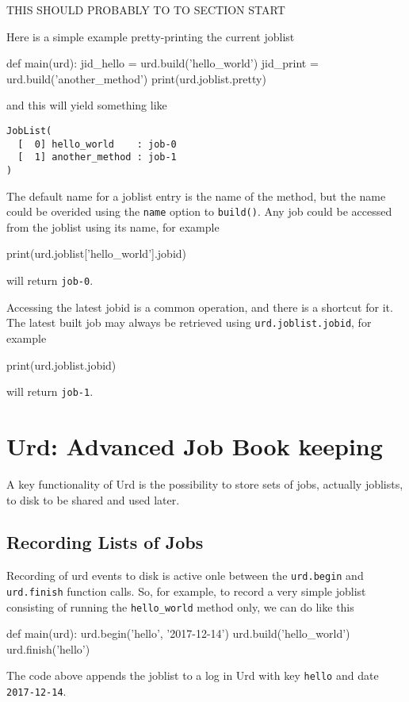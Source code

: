 \documentclass[a4paper]{article}
\begin{document}
THIS SHOULD PROBABLY TO TO SECTION START

Here is a simple example pretty-printing the current joblist
\begin{python}
def main(urd):
  jid_hello = urd.build('hello_world')
  jid_print = urd.build('another_method')
  print(urd.joblist.pretty)
\end{python}
and this will yield something like
\begin{verbatim}
JobList(
  [  0] hello_world    : job-0
  [  1] another_method : job-1
)
\end{verbatim}
The default name for a joblist entry is the name of the method, but
the name could be overided using the \texttt{name} option to
\texttt{build()}.  Any job could be accessed from the joblist using
its name, for example
\begin{python}
  print(urd.joblist['hello_world'].jobid)
\end{python}
will return \texttt{job-0}.


Accessing the latest jobid is a common operation, and there is a
shortcut for it.  The latest built job may always be retrieved using
\texttt{urd.joblist.jobid}, for example
\begin{python}
  print(urd.joblist.jobid)
\end{python}
will return \texttt{job-1}.





\clearpage
\section{Urd: Advanced Job Book keeping}
A key functionality of Urd is the possibility to store sets of jobs,
actually joblists, to disk to be shared and used later.

\subsection{Recording Lists of Jobs}
Recording of urd events to disk is active onle between the
\texttt{urd.begin} and \texttt{urd.finish} function calls.  So, for
example, to record a very simple joblist consisting of running the
\texttt{hello\_world} method only, we can do like this
\begin{python}
def main(urd):
  urd.begin('hello', '2017-12-14')
  urd.build('hello_world')
  urd.finish('hello')
\end{python}
The code above appends the joblist to a log in Urd with key
\texttt{hello} and date \texttt{2017-12-14}.
\end{document}
